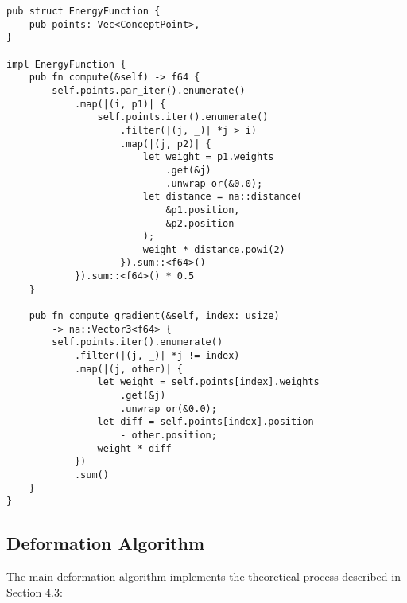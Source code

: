 \documentclass{article}
\begin{document}
\begin{verbatim}
pub struct EnergyFunction {
    pub points: Vec<ConceptPoint>,
}

impl EnergyFunction {
    pub fn compute(&self) -> f64 {
        self.points.par_iter().enumerate()
            .map(|(i, p1)| {
                self.points.iter().enumerate()
                    .filter(|(j, _)| *j > i)
                    .map(|(j, p2)| {
                        let weight = p1.weights
                            .get(&j)
                            .unwrap_or(&0.0);
                        let distance = na::distance(
                            &p1.position, 
                            &p2.position
                        );
                        weight * distance.powi(2)
                    }).sum::<f64>()
            }).sum::<f64>() * 0.5
    }
    
    pub fn compute_gradient(&self, index: usize) 
        -> na::Vector3<f64> {
        self.points.iter().enumerate()
            .filter(|(j, _)| *j != index)
            .map(|(j, other)| {
                let weight = self.points[index].weights
                    .get(&j)
                    .unwrap_or(&0.0);
                let diff = self.points[index].position 
                    - other.position;
                weight * diff
            })
            .sum()
    }
}
\end{verbatim}

\subsection{Deformation Algorithm}
The main deformation algorithm implements the theoretical process described in Section 4.3:
\end{document}
